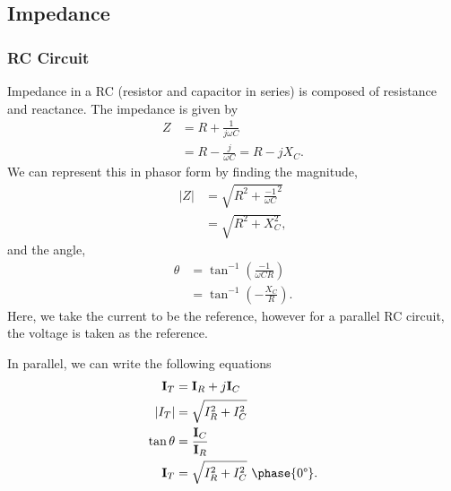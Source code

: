 \documentclass{article}
\begin{document}
\subsection{Impedance}
\subsubsection{RC Circuit}
Impedance in a RC (resistor and capacitor in series) is composed of resistance and reactance. The impedance is given by
\begin{align*}
    Z &= R+\frac{1}{j\omega C}\\
      &=R-\frac{j}{\omega C}=R-jX_C.
\end{align*}
We can represent this in phasor form by finding the magnitude,
\begin{align*}
    \left| Z \right| &= \sqrt{R^2+\frac{-1}{\omega C}^2}\\
                    &=\sqrt{R^2+X_C^2},
\end{align*}
and the angle,
\begin{align*}
    \theta  &= \tan^{-1}\left( \frac{-1}{\omega CR} \right)\\
            &=\tan^{-1}\left( -\frac{X_C}{R} \right).
\end{align*}
Here, we take the current to be the reference, however for a parallel RC circuit, the voltage is taken as the reference.

In parallel, we can write the following equations
\begin{align*}
    \mathbf{I}_T &= \mathbf{I}_R+j\mathbf{I}_C\\
    \left| I_T \right|&=\sqrt{I_R^2+I_C^2}\\
    \tan\theta &=\frac{\mathbf{I}_C}{\mathbf{I}_R}\\
    \mathbf{I}_T&=\sqrt{I_R^2+I_C^2}\ \phase{0\degree}.
\end{align*}
\end{document}
